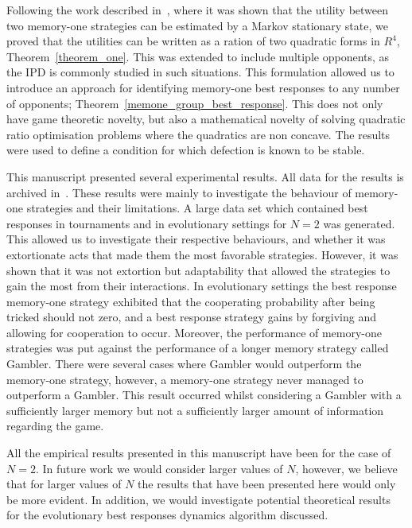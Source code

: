 \documentclass[9pt,twocolumn,twoside,lineno]{pnas-new}
\begin{document}
Following the work described in~\cite{Nowak1989}, where it was shown that the
utility between two memory-one strategies can be estimated by a Markov
stationary state, we proved that the utilities can be written as a ration of two
quadratic forms in $R^4$, Theorem~\ref{theorem_one}. This was extended to
include multiple opponents, as the IPD is commonly studied in such situations.
This formulation allowed us to introduce an approach for identifying memory-one
best responses to any number of opponents;
Theorem~\ref{memone_group_best_response}. This does not only have game theoretic
novelty, but also a mathematical novelty of solving quadratic ratio optimisation
problems where the quadratics are non concave. The results were used to
define a condition for which defection is known to be stable.

This manuscript presented several experimental results. All data for the results
is archived in~\cite{glynatsi2019}. These results were mainly to investigate the
behaviour of memory-one strategies and their limitations. A large data set which
contained best responses in tournaments and in evolutionary settings for $N=2$
was generated. This allowed us to investigate their respective behaviours, and
whether it was extortionate acts that made them the most favorable strategies.
However, it was shown that it was not extortion but adaptability that allowed
the strategies to gain the most from their interactions. In evolutionary
settings the best response memory-one strategy exhibited that the cooperating
probability after being tricked should not zero, and a best response
strategy gains by forgiving and allowing for cooperation to occur. Moreover, the performance of
memory-one strategies was put against the performance of a longer memory
strategy called Gambler. There were several cases where Gambler would outperform
the memory-one strategy, however, a memory-one strategy never managed to
outperform a Gambler. This result occurred whilst considering a Gambler with a
sufficiently larger memory but not a sufficiently larger amount of information
regarding the game.

All the empirical results presented in this manuscript have been for the case of
$N=2$. In future work we would consider larger values of $N$, however, we
believe that for larger values of $N$ the results that have been presented here
would only be more evident. In addition, we would investigate potential
theoretical results for the evolutionary best responses dynamics algorithm
discussed.

\showmatmethods{} %
\end{document}
